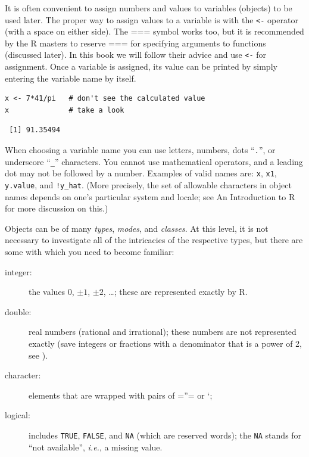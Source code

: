 \documentclass[captions=tableheading]{scrbook}
\begin{document}
It is often convenient to assign numbers and values to variables (objects) to be used later. The proper way to assign values to a variable is with the \texttt{<-} operator (with a space on either side). The === symbol works too, but it is recommended by the \textsf{R} masters to reserve === for specifying arguments to functions (discussed later). In this book we will follow their advice and use \texttt{<-} for assignment. Once a variable is assigned, its value can be printed by simply entering the variable name by itself.


\begin{verbatim}
x <- 7*41/pi   # don't see the calculated value
x              # take a look
\end{verbatim}

\begin{verbatim}
 [1] 91.35494
\end{verbatim}

When choosing a variable name you can use letters, numbers, dots ``\texttt{.}'', or underscore ``\texttt{\_}'' characters. You cannot use mathematical operators, and a leading dot may not be followed by a number. Examples of valid names are: \texttt{x}, \texttt{x1}, \texttt{y.value}, and \texttt{!y\_hat}. (More precisely, the set of allowable characters in object names depends on one's particular system and locale; see An Introduction to \textsf{R} for more discussion on this.)

Objects can be of many \emph{types}, \emph{modes}, and \emph{classes}. At this level, it is not necessary to investigate all of the intricacies of the respective types, but there are some with which you need to become familiar:

\begin{description}
\item[integer:] the values \(0\), \(\pm1\), \(\pm2\), \ldots{}; these are represented exactly by \textsf{R}.
\item[double:] real numbers (rational and irrational); these numbers are not represented exactly (save integers or fractions with a denominator that is a power of 2, see \cite{Venables2010}).
\item[character:] elements that are wrapped with pairs of =''= or `;
\item[logical:] includes \texttt{TRUE}, \texttt{FALSE}, and \texttt{NA} (which are reserved words); the \texttt{NA} stands for ``not available'', \emph{i.e.}, a missing value.
\end{description}
\end{document}
